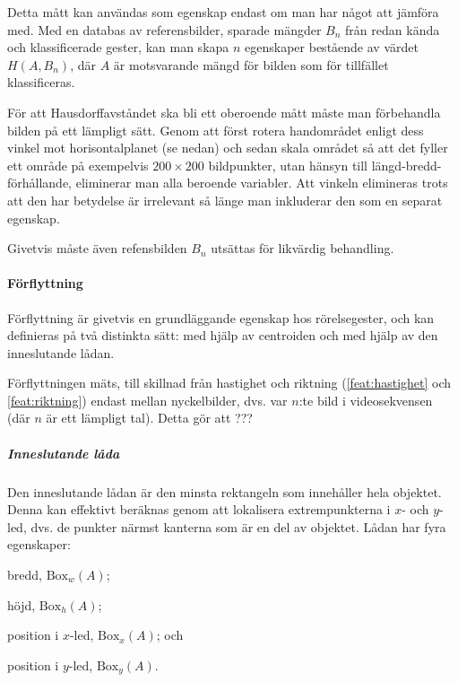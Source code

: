 \documentclass[../rapport_MVEX01-11-05]{subfiles}
\begin{document}
Detta mått kan användas som egenskap endast om man har något att
jämföra med. Med en databas av referensbilder, sparade mängder $B_n$ från redan kända
och klassificerade gester, kan man skapa $n$ egenskaper bestående av
värdet $H(A,B_n)$, där $A$ är motsvarande mängd för bilden som för
tillfället klassificeras.

För att Hausdorffavståndet ska bli ett oberoende mått måste man
förbehandla bilden på ett lämpligt sätt. Genom att först rotera
handområdet enligt dess vinkel mot horisontalplanet (se nedan)
och sedan skala området så att det fyller ett
område på exempelvis $200\times200$ bildpunkter, utan hänsyn till
längd-bredd-förhållande, eliminerar man alla beroende variabler. Att
vinkeln elimineras trots att den har betydelse är irrelevant så länge
man inkluderar den som en separat egenskap.

Givetvis måste även refensbilden $B_n$ utsättas för likvärdig behandling.

\paragraph{Förflyttning}
\label{feat:forflytt}

Förflyttning är givetvis en grundläggande egenskap hos rörelsegester,
och kan definieras på två distinkta sätt: med hjälp av centroiden och
med hjälp av den inneslutande lådan.

Förflyttningen mäts, till skillnad från hastighet och riktning
(\ref{feat:hastighet} och \ref{feat:riktning}) endast mellan
nyckelbilder, dvs. var $n$:te bild i videosekvensen (där $n$ är ett
lämpligt tal). Detta gör att ???


\subparagraph{Inneslutande låda}

Den inneslutande lådan är den minsta rektangeln som innehåller hela
objektet. Denna kan effektivt beräknas genom att lokalisera
extrempunkterna i $x$- och $y$-led, dvs. de punkter närmst kanterna
som är en del av objektet. Lådan har fyra egenskaper:
\begin{inparaenum}[\itshape 1\upshape)]
  \item bredd, $\textrm{Box}_w(A)$;
  \item höjd, $\textrm{Box}_h(A)$;
  \item position i $x$-led, $\textrm{Box}_x(A)$; och
  \item position i $y$-led, $\textrm{Box}_y(A)$.
\end{inparaenum}
\end{document}
